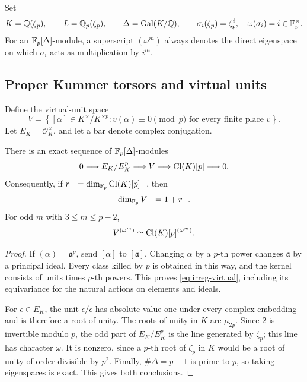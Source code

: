 Set
\[
 K=\mathbb Q(\zeta_p),\qquad L=\mathbb Q_p(\zeta_p),\qquad
 \Delta=\operatorname{Gal}(K/\mathbb Q),\qquad
 \sigma_i(\zeta_p)=\zeta_p^i,\quad
 \omega(\sigma_i)=i\in\mathbb F_p^\times.
\]
For an \(\mathbb F_p[\Delta]\)-module, a superscript \((\omega^m)\)
always denotes the direct eigenspace on which \(\sigma_i\) acts
as multiplication by \(i^m\).

\subsection{Proper Kummer torsors and virtual units}
\label{sec:irreg-torsors}

Define the virtual-unit space
\[
 V=\left\{[\alpha]\in K^\times/K^{\times p}:
             v(\alpha)\equiv0\pmod p
             \text{ for every finite place }v\right\}.
\]
Let \(E_K=\mathcal O_K^\times\), and let a bar denote complex conjugation.

\begin{lemma}\label{lem:irreg-virtual}
There is an exact sequence of \(\mathbb F_p[\Delta]\)-modules
\begin{equation}
 0\longrightarrow E_K/E_K^p
   \longrightarrow V
   \longrightarrow\operatorname{Cl}(K)[p]\longrightarrow0.
 \label{eq:irreg-virtual}
\end{equation}
Consequently, if \(r^-=\dim_{\mathbb F_p}\operatorname{Cl}(K)[p]^-\), then
\begin{equation}
 \dim_{\mathbb F_p}V^-=1+r^-.
 \label{eq:irreg-minus-dim}
\end{equation}
For odd \(m\) with \(3\leq m\leq p-2\),
\begin{equation}
 V^{(\omega^m)}\simeq\operatorname{Cl}(K)[p]^{(\omega^m)}.
 \label{eq:irreg-odd-components}
\end{equation}
\end{lemma}

\begin{proof}
If \((\alpha)=\mathfrak a^p\), send \([\alpha]\) to
\([\mathfrak a]\). Changing \(\alpha\) by a \(p\)-th power changes
\(\mathfrak a\) by a principal ideal. Every class killed by \(p\)
is obtained in this way, and the kernel consists of units times
\(p\)-th powers. This proves \eqref{eq:irreg-virtual}, including its
equivariance for the natural actions on elements and ideals.

For \(\epsilon\in E_K\), the unit
\(\epsilon/\overline\epsilon\) has absolute value one under every
complex embedding and is therefore a root of unity. The roots of
unity in \(K\) are \(\mu_{2p}\). Since \(2\) is invertible modulo \(p\),
the odd part of \(E_K/E_K^p\) is the line generated by \(\zeta_p\);
this line has character \(\omega\). It is nonzero, since a \(p\)-th
root of \(\zeta_p\) in \(K\) would be a root of unity of order divisible
by \(p^2\). Finally, \(\#\Delta=p-1\) is prime to \(p\), so taking
eigenspaces is exact. This gives both conclusions.
\end{proof}

